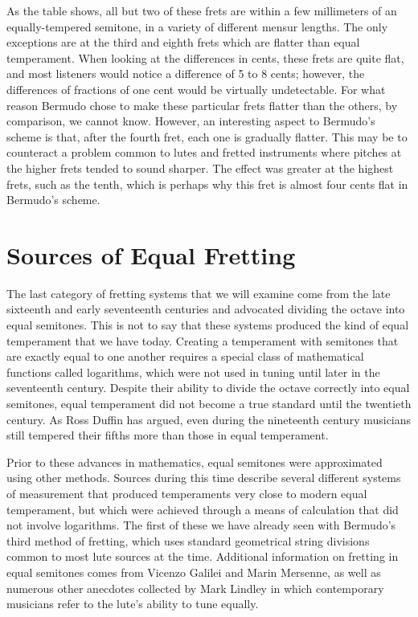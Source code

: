 As the table shows, all but two of these frets are within a few millimeters of an equally-tempered semitone, in a
variety of different mensur lengths. The only exceptions are at the third and eighth frets which are flatter than equal
temperament. When looking at the differences in cents, these frets are quite flat, and most listeners would notice a
difference of 5 to 8 cents; however, the differences of fractions of one cent would be virtually undetectable. For what
reason Bermudo chose to make these particular frets flatter than the others, by comparison, we cannot know. However, an
interesting aspect to Bermudo's scheme is that, after the fourth fret, each one is gradually flatter. This may be to
counteract a problem common to lutes and fretted instruments where pitches at the higher frets tended to sound sharper.
The effect was greater at the highest frets, such as the tenth, which is perhaps why this fret is almost four cents flat
in Bermudo's scheme.

\section{Sources of Equal Fretting}

The last category of fretting systems that we will examine come from the late sixteenth and early seventeenth centuries
and advocated dividing the octave into equal semitones. This is not to say that these systems produced the kind of equal
temperament that we have today. Creating a temperament with semitones that are exactly equal to one another requires a
special class of mathematical functions called logarithms, which were not used in tuning until later in the seventeenth
century. Despite their ability to divide the octave correctly into equal semitones, equal temperament did not become a
true standard until the twentieth century. As Ross Duffin has argued, even during the nineteenth century musicians
still tempered their fifths more than those in equal temperament.

Prior to these advances in mathematics, equal semitones were approximated using other methods. Sources during this time
describe several different systems of measurement that produced temperaments very close to modern equal temperament, but
which were achieved through a means of calculation that did not involve logarithms. The first of these we have already
seen with Bermudo's third method of fretting, which uses standard geometrical string divisions common to most lute
sources at the time. Additional information on fretting in equal semitones comes from Vicenzo Galilei and Marin
Mersenne, as well as numerous other anecdotes collected by Mark Lindley in which contemporary musicians refer to the
lute's ability to tune equally.


